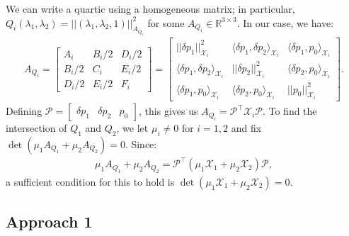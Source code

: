 \documentclass{article}
\begin{document}
We can write a quartic using a homogeneous matrix; in particular,
$Q_i(\lambda_1, \lambda_2) = ||(\lambda_1, \lambda_2,
1)||_{A_{Q_i}}^2$ for some $A_{Q_i} \in \mathbb{R}^{3 \times 3}$. In our case, we have:
\begin{align*}
  A_{Q_i} = \begin{bmatrix}
    A_i & B_i/2 & D_i/2 \\
    B_i/2 & C_i & E_i/2 \\
    D_i/2 & E_i/2 & F_i
  \end{bmatrix} = \begin{bmatrix}
    ||\delta p_1||_{\mathcal{X}_i}^2 & \langle \delta p_1, \delta p_2 \rangle_{\mathcal{X}_i} & \langle \delta p_1, p_0 \rangle_{\mathcal{X}_i} \\
    \langle \delta p_1, \delta p_2 \rangle_{\mathcal{X}_i} & ||\delta p_2||_{\mathcal{X}_i}^2 & \langle \delta p_2, p_0 \rangle_{\mathcal{X}_i} \\
    \langle \delta p_1, p_0 \rangle_{\mathcal{X}_i} & \langle \delta p_2, p_0 \rangle_{\mathcal{X}_i} & ||p_0||_{\mathcal{X}_i}^2
  \end{bmatrix}.
\end{align*}
Defining
$\mathcal{P} = \begin{bmatrix} \delta p_1 & \delta p_2 &
  p_0 \end{bmatrix}$, this gives us
$A_{Q_i} = \mathcal{P}^\top \mathcal{X}_i \mathcal{P}$. To find the
intersection of $Q_1$ and $Q_2$, we let $\mu_i \neq 0$ for $i = 1, 2$
and fix $\det(\mu_1 A_{Q_1} + \mu_2 A_{Q_2}) = 0$. Since:
\begin{align*}
  \mu_1 A_{Q_1} + \mu_2 A_{Q_2} = \mathcal{P}^\top {(\mu_1 \mathcal{X}_1 + \mu_2 \mathcal{X}_2)} \mathcal{P},
\end{align*}
a sufficient condition for this to hold is
$\det(\mu_1 \mathcal{X}_1 + \mu_2 \mathcal{X}_2) = 0$.

\subsection*{Approach 1}
\end{document}
